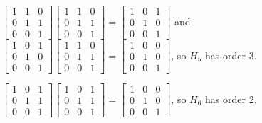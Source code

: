 \documentclass[12pt,letterpaper]{article}
\begin{document}
\begin{enumerate}
\begin{enumerate}
          $
            \begin{bmatrix}
              1 & 1 & 0 \\
              0 & 1 & 1 \\
              0 & 0 & 1
            \end{bmatrix}
            \begin{bmatrix}
              1 & 1 & 0 \\
              0 & 1 & 1 \\
              0 & 0 & 1
            \end{bmatrix}
            =
            \begin{bmatrix}
              1 & 0 & 1 \\
              0 & 1 & 0 \\
              0 & 0 & 1
            \end{bmatrix}
          $ and
          $
            \begin{bmatrix}
              1 & 0 & 1 \\
              0 & 1 & 0 \\
              0 & 0 & 1
            \end{bmatrix}
            \begin{bmatrix}
              1 & 1 & 0 \\
              0 & 1 & 1 \\
              0 & 0 & 1
            \end{bmatrix}
            =
            \begin{bmatrix}
              1 & 0 & 0 \\
              0 & 1 & 0 \\
              0 & 0 & 1
            \end{bmatrix}
          $, so $H_5$ has order 3.

          $
            \begin{bmatrix}
              1 & 0 & 1 \\
              0 & 1 & 1 \\
              0 & 0 & 1
            \end{bmatrix}
            \begin{bmatrix}
              1 & 0 & 1 \\
              0 & 1 & 1 \\
              0 & 0 & 1
            \end{bmatrix}
            =
            \begin{bmatrix}
              1 & 0 & 0 \\
              0 & 1 & 0 \\
              0 & 0 & 1
            \end{bmatrix}
          $, so $H_6$ has order 2.


\end{enumerate}
\end{enumerate}
\end{document}
